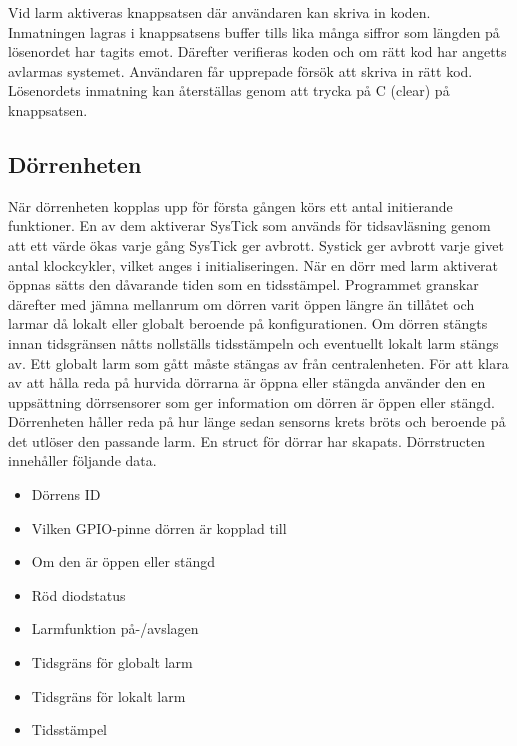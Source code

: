 Vid larm aktiveras knappsatsen där användaren kan skriva in koden. Inmatningen lagras i knappsatsens buffer tills lika många siffror som längden på lösenordet har tagits emot. Därefter verifieras koden och om rätt kod har angetts avlarmas systemet. Användaren får upprepade försök att skriva in rätt kod. Lösenordets inmatning kan återställas genom att trycka på C (clear) på knappsatsen.

\subsection{Dörrenheten} 
\label{sec:dörrenheten}
När dörrenheten kopplas upp för första gången körs ett antal initierande funktioner. En av dem aktiverar SysTick som används för tidsavläsning genom att ett värde ökas varje gång SysTick ger avbrott. Systick ger avbrott varje givet antal klockcykler, vilket anges i initialiseringen. När en dörr med larm aktiverat öppnas sätts den dåvarande tiden som en tidsstämpel. Programmet granskar därefter med jämna mellanrum om dörren varit öppen längre än tillåtet och larmar då lokalt eller globalt beroende på konfigurationen. Om dörren stängts innan tidsgränsen nåtts nollställs tidsstämpeln och eventuellt lokalt larm stängs av. Ett globalt larm som gått måste stängas av från centralenheten.
\newline\newline
För att klara av att hålla reda på hurvida dörrarna är öppna eller stängda använder den en uppsättning dörrsensorer som ger information om dörren är öppen eller stängd. Dörrenheten håller reda på hur länge sedan sensorns krets bröts och beroende på det utlöser den passande larm.
\newline\newline
En struct för dörrar har skapats. Dörrstructen innehåller följande data.
\begin{itemize}
    \item Dörrens ID
    \item Vilken GPIO-pinne dörren är kopplad till
    \item Om den är öppen eller stängd
    \item Röd diodstatus
    \item Larmfunktion på-/avslagen
    \item Tidsgräns för globalt larm
    \item Tidsgräns för lokalt larm
    \item Tidsstämpel
\end{itemize}


